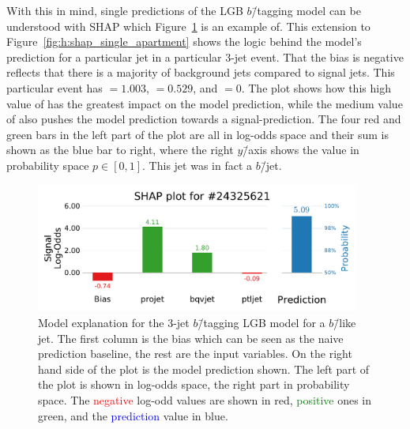 With this in mind, single predictions of the LGB $b$\=/tagging model can be understood with SHAP which Figure~\ref{fig:q:shap_single_prediction_3j} is an example of. This extension to Figure~\ref{fig:h:shap_single_apartment} shows the logic behind the model's prediction for a particular jet in a particular 3-jet event. That the bias is negative reflects that there is a majority of background jets compared to signal jets. This particular event has $=1.003$, $=0.529$, and $=0$. The plot shows how this high value of  has the greatest impact on the model prediction, while the medium value of  also pushes the model prediction towards a signal-prediction. The four red and green bars in the left part of the plot are all in log-odds space and their sum is shown as the blue bar to right, where the right $y$\=/axis shows the value in probability space $p\in [0,1]$. This jet was in fact a $b$\=/jet.

\begin{figure}[h!]
  \centerfloat
  \includegraphics[width=0.95\textwidth, trim=0 0 0 40, clip]{figures/quarks/shap_values-down_sample=1.00-ML_vars=vertex-selection=b-ejet_min=4-n_iter_RS_lgb=99-n_iter_RS_xgb=9-cdot_cut=0.90-version=19-njet=3loc=24325621.pdf}
  \caption[SHAP 3-Jet Model Explanation for $b$\=/Like Jet]
          {Model explanation for the 3-jet $b$\=/tagging LGB model for a $b$\=/like jet. The first column is the bias which can be seen as the naive prediction baseline, the rest are the input variables. On the right hand side of the plot is the model prediction shown. The left part of the plot is shown in log-odds space, the right part in probability space. The \textcolor{red}{negative} log-odd values are shown in red, \textcolor{green}{positive} ones in green, and the \textcolor{blue}{prediction} value in blue. 
          } 
  \label{fig:q:shap_single_prediction_3j}
\end{figure}



